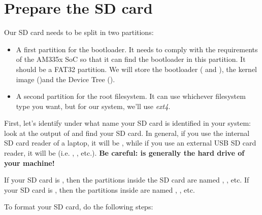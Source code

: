 \section{Prepare the SD card}

Our SD card needs to be split in two partitions:

\begin{itemize}

\item A first partition for the bootloader. It needs to comply with
  the requirements of the AM335x SoC so that it can find the bootloader in
  this partition. It should be a FAT32 partition. We will store the
  bootloader ( and ), the kernel image
  ()and the Device Tree ().

\item A second partition for the root filesystem. It can use
  whichever filesystem type you want, but for our system, we'll use
  {\em ext4}.

\end{itemize}

First, let's identify under what name your SD card is identified in
your system: look at the output of  and
find your SD card. In general, if you use the internal SD card reader
of a laptop, it will be , while if you use an external
USB SD card reader, it will be  (i.e. , ,
etc.). {\bf Be careful:  is generally the hard drive of
  your machine!}

If your SD card is , then the partitions inside the
SD card are named , , etc. If your SD
card is , then the partitions inside are named
, , etc.

To format your SD card, do the following steps:

